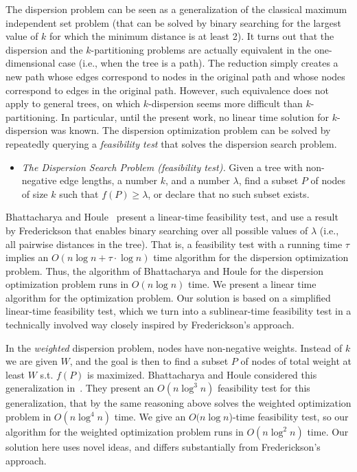 \documentclass[a4paper,UKenglish]{lipics-v2016}
\theoremstyle{plain}
\begin{document}
\noindent The dispersion problem can be seen as a generalization of the classical maximum independent set problem (that can be solved by binary searching for the largest value of $k$ for which the minimum distance is at least 2).  
%
It turns out that the dispersion and the $k$-partitioning problems are actually equivalent in the one-dimensional case (i.e., when the tree is a path). The reduction simply creates a new path whose edges correspond to nodes in the original path and whose nodes correspond to edges in the original path. However, such equivalence does not apply to general trees, on which $k$-dispersion seems more difficult than $k$-partitioning. In particular, until the present work, no linear time solution for $k$-dispersion was known. 
The dispersion optimization problem can be solved by repeatedly querying a {\em feasibility test} that solves the dispersion search problem. 

\begin{itemize}
\item  {\em The Dispersion Search Problem (feasibility test).}  Given a tree with non-negative edge lengths, a number $k$, and a number $\lambda$, find a subset $P$ of nodes of size $k$ such that  $f(P)\geq\lambda$, or declare that no such subset exists. 
\end{itemize}

\noindent Bhattacharya and Houle~\cite{Bhattacharya1991} present a linear-time feasibility test, and use a result by Frederickson \cite{Frederickson1983} that enables binary searching over all possible values of $\lambda$ (i.e., all pairwise distances in the tree). That is, a feasibility test with a running time $\tau$ implies an $O(n \log n + \tau \cdot \log n)$ time algorithm for the dispersion optimization problem. Thus, the algorithm of Bhattacharya and Houle for the dispersion optimization problem runs in $O(n\log n)$ time. We present a linear time algorithm for the optimization problem. Our solution is based on a simplified linear-time feasibility test, which we turn into a sublinear-time feasibility test in a technically involved way closely inspired by Frederickson's approach.

In the {\em weighted} dispersion problem, nodes have non-negative weights. Instead of $k$ we are given $W$, and the goal is then to find a subset
$P$ of nodes of total weight at least $W$ s.t. $f(P)$ is maximized. Bhattacharya and Houle considered this generalization in~\cite{Bhattacharya1999}. They present an $O(n \log^3 n)$ feasibility test for this generalization, that by the same reasoning above solves the weighted optimization problem in $O(n \log^4 n)$ time. We give an $O(n \log n$)-time feasibility test, so our algorithm for the weighted optimization problem runs in $O(n \log^2 n)$ time. Our solution here uses novel ideas, and differs substantially from Frederickson's approach.
\end{document}
